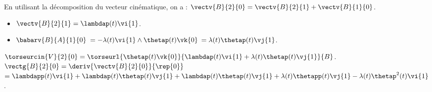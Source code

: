 \begin{corrigebox}
En utilisant la décomposition du vecteur cinématique, on a :
$\vectv{B}{2}{0} = \vectv{B}{2}{1}+\vectv{B}{1}{0}$.

\begin{itemize}
\item $\vectv{B}{2}{1} = \lambdap(t) \vi{1}$.
\item $\babarv{B}{A}{1}{0}$ $=-\lambda(t)\vi{1}\wedge\thetap(t)\vk{0}$ $=\lambda(t)\thetap(t)\vj{1}$.
\end{itemize}

$\torseurcin{V}{2}{0} = \torseurl{\thetap(t)\vk{0}}{\lambdap(t) \vi{1}+\lambda(t)\thetap(t)\vj{1}}{B}$.
$\vectg{B}{2}{0} = \deriv{\vectv{B}{2}{0}}{\rep{0}}$
$= \lambdapp(t) \vi{1}+\lambdap(t) \thetap(t) \vj{1}+\lambdap(t)\thetap(t)\vj{1}+\lambda(t)\thetapp(t)\vj{1}-\lambda(t)\thetap^2(t)\vi{1} $.
\end{corrigebox}
